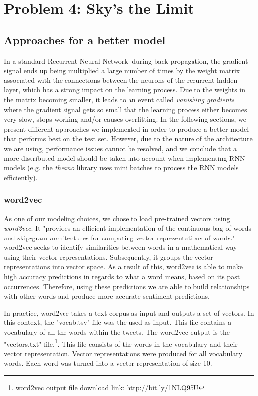 \documentclass{article} %
\begin{document}
\section{Problem 4: Sky's the Limit}

\subsection{Approaches for a better model}

In a standard Recurrent Neural Network, during back-propagation, the gradient signal ends up being multiplied a large number of times by the weight matrix associated with the connections between the neurons of the recurrent hidden layer, which has a strong impact on the learning process. Due to the weights in the matrix becoming smaller, it leads to an event called \textit{vanishing gradients} where the gradient signal gets so small that the learning process either becomes very slow, stops working and/or causes overfitting. In the following sections, we present different approaches we implemented in order to produce a better model that performs best on the test set. However, due to the nature of the architecture we are using, performance issues cannot be resolved, and we conclude that a more distributed model should be taken into account when implementing RNN models (e.g. the \textit{theano} library uses mini batches to process the RNN models efficiently).

\subsubsection*{word2vec}

As one of our modeling choices, we chose to load pre-trained vectors using \textit{word2vec}. It "provides an efficient implementation of the continuous bag-of-words and skip-gram architectures for computing vector representations of words."\cite{word2vec} word2vec seeks to identify similarities between words in a mathematical way using their vector representations. Subsequently, it groups the vector representations into vector space. As a result of this, word2vec is able to make high accuracy predictions in regards to what a word means, based on its past occurrences. Therefore, using these predictions we are able to build relationships with other words and produce more accurate sentiment predictions.

In practice, word2vec takes a text corpus as input and outputs a set of vectors. In this context, the "vocab.tsv" file was the used as input. This file contains a vocabulary of all the words within the tweets. The word2vec output is the "vectors.txt" file.\footnote{word2vec output file download link: \url{http://bit.ly/1NLQ95U}}. This file consists of the words in the vocabulary and their vector representation. Vector representations were produced for all vocabulary words. Each word was turned into a vector representation of size 10.
\end{document}
